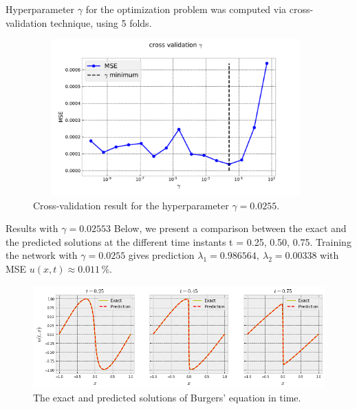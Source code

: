\documentclass{beamer}
\begin{document}
\begin{frame}

Hyperparameter $\gamma$ for the optimization problem was computed via cross-validation technique, using 5 folds. 
\begin{figure}
    \centering
    \includegraphics[width=11cm, height=6cm]{images/cross_val_gamma.pdf}
    \caption{Cross-validation result for the hyperparameter $\gamma = 0.0255$.}
    \label{fig:cross_val_gamma}
\end{figure}
    
\end{frame}

\begin{frame}{Results with $\gamma=0.02553$}
Below, we present a comparison between the exact and the predicted solutions at the different time instants t = 0.25, 0.50, 0.75. Training the network with $\gamma=0.0255$ gives prediction $\lambda_1 =
0.986564, ~ \lambda_2 = 0.00338$ with MSE $u(x, t) \approx 0.011 \,\%$.

\begin{figure}
    \centering
    \includegraphics[scale=0.43]{images/burgers-exact-predict.png}
    \caption{The exact and predicted solutions of Burgers' equation in time.}
    \label{fig:burgers-exact-predict}
\end{figure}

\end{frame}
\end{document}
